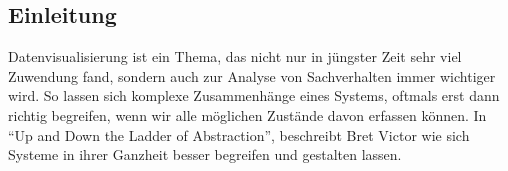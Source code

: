 \begin{newpage}
	\section{Einleitung}
	\label{sec:Einleitung}




		Datenvisualisierung ist ein Thema, das nicht nur in jüngster Zeit sehr viel Zuwendung fand, sondern auch zur Analyse von Sachverhalten immer wichtiger wird. So lassen sich komplexe Zusammenhänge eines Systems, oftmals erst dann richtig begreifen, wenn wir alle möglichen Zustände davon erfassen können. In "`Up and Down the Ladder of Abstraction"', beschreibt Bret Victor wie sich Systeme in ihrer Ganzheit besser begreifen und gestalten lassen.


\end{newpage}
